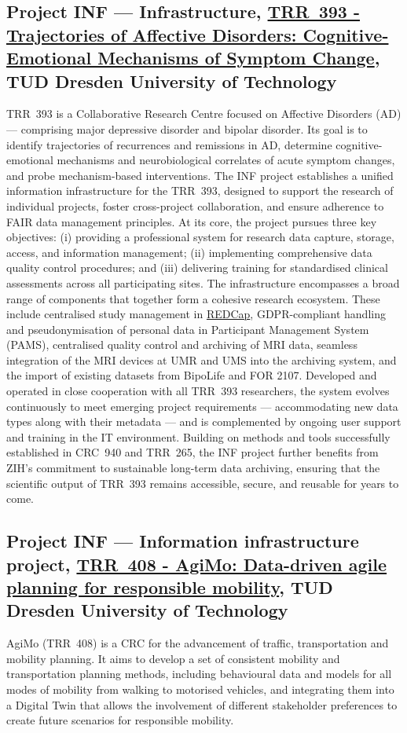 \documentclass{eceasst}
\begin{document}
\subsection{Project INF --- Infrastructure, \href{https://gepris.dfg.de/gepris/projekt/521379614?language=en}{TRR~393 - Trajectories of Affective Disorders: Cognitive-Emotional Mechanisms of Symptom Change}, TUD Dresden University of Technology}
\label{subsec:trr393}
TRR~393 is a Collaborative Research Centre focused on Affective Disorders (AD) — comprising major depressive disorder and bipolar disorder. Its goal is to identify trajectories of recurrences and remissions in AD, determine cognitive-emotional mechanisms and neurobiological correlates of acute symptom changes, and probe mechanism-based interventions.
The INF project establishes a unified information infrastructure for the TRR~393, designed to support the research of individual projects, foster cross-project collaboration, and ensure adherence to FAIR data management principles.
At its core, the project pursues three key objectives:
(i) providing a professional system for research data capture, storage, access, and information management; 
(ii) implementing comprehensive data quality control procedures; and 
(iii) delivering training for standardised clinical assessments across all participating sites.
The infrastructure encompasses a broad range of components that together form a cohesive research ecosystem.
These include centralised study management in \href{https://project-redcap.org/}{REDCap}, GDPR-compliant handling and pseudonymisation of personal data in Participant Management System (PAMS),
centralised quality control and archiving of MRI data, seamless integration of the MRI devices at UMR and UMS into the archiving system, and the import of existing datasets from BipoLife and FOR 2107.
Developed and operated in close cooperation with all TRR~393 researchers, the system evolves continuously to meet emerging project requirements — accommodating new data types along with their metadata — and is complemented by ongoing user support and training in the IT environment.
Building on methods and tools successfully established in CRC~940 and TRR~265, the INF project further benefits from ZIH's commitment to sustainable long-term data archiving, ensuring that the scientific output of TRR~393 remains accessible, secure, and reusable for years to come.

\subsection{Project INF --- Information infrastructure project, \href{https://gepris.dfg.de/gepris/projekt/531327426?language=en}{TRR~408 - AgiMo: Data-driven agile planning for responsible mobility}, TUD Dresden University of Technology}
\label{subsec:trr408}
AgiMo (TRR~408) is a CRC for the advancement of traffic, transportation and mobility planning.
It aims to develop a set of consistent mobility and transportation planning methods, including behavioural data and models for all modes of mobility from walking to motorised vehicles, and integrating them into a Digital Twin that allows the involvement of different stakeholder preferences to create future scenarios for responsible mobility.
\end{document}
